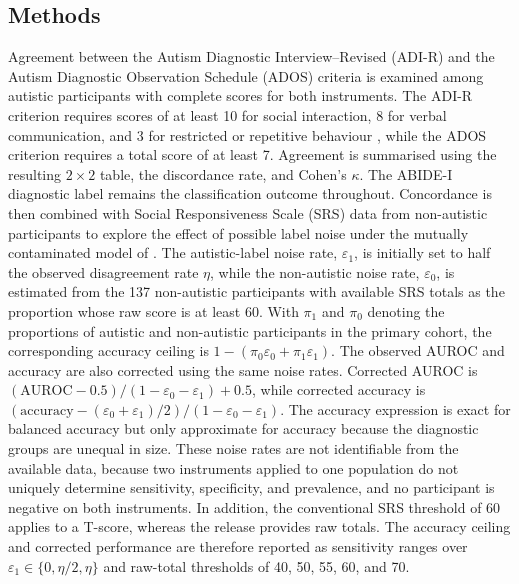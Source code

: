 \documentclass[a4paper,fleqn]{cas-sc}
\begin{document}
\subsection{Methods}
Agreement between the Autism Diagnostic Interview--Revised (ADI-R) and the Autism Diagnostic Observation Schedule (ADOS) criteria is examined among autistic participants with complete scores for both instruments. The ADI-R criterion requires scores of at least 10 for social interaction, 8 for verbal communication, and 3 for restricted or repetitive behaviour \citep{Lordetal1994}, while the ADOS criterion requires a total score of at least 7. Agreement is summarised using the resulting $2\times2$ table, the discordance rate, and Cohen's $\kappa$. The ABIDE-I diagnostic label remains the classification outcome throughout. Concordance is then combined with Social Responsiveness Scale (SRS) data from non-autistic participants to explore the effect of possible label noise under the mutually contaminated model of \citet{Menonetal2015}. The autistic-label noise rate, $\varepsilon_1$, is initially set to half the observed disagreement rate $\eta$, while the non-autistic noise rate, $\varepsilon_0$, is estimated from the 137 non-autistic participants with available SRS totals as the proportion whose raw score is at least 60. With $\pi_1$ and $\pi_0$ denoting the proportions of autistic and non-autistic participants in the primary cohort, the corresponding accuracy ceiling is $1-(\pi_0\varepsilon_0+\pi_1\varepsilon_1)$. The observed AUROC and accuracy are also corrected using the same noise rates. Corrected AUROC is $(\mathrm{AUROC}-0.5)/(1-\varepsilon_0-\varepsilon_1)+0.5$, while corrected accuracy is $(\mathrm{accuracy}-(\varepsilon_0+\varepsilon_1)/2)/(1-\varepsilon_0-\varepsilon_1)$. The accuracy expression is exact for balanced accuracy but only approximate for accuracy because the diagnostic groups are unequal in size. These noise rates are not identifiable from the available data, because two instruments applied to one population do not uniquely determine sensitivity, specificity, and prevalence, and no participant is negative on both instruments. In addition, the conventional SRS threshold of 60 applies to a T-score, whereas the release provides raw totals. The accuracy ceiling and corrected performance are therefore reported as sensitivity ranges over $\varepsilon_1\in\{0,\eta/2,\eta\}$ and raw-total thresholds of 40, 50, 55, 60, and 70.
\end{document}

